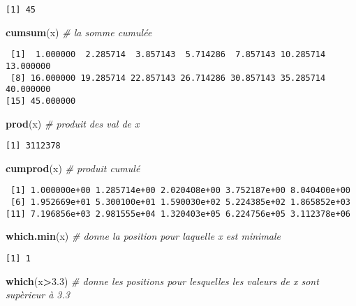 \documentclass[
]{article}
\newenvironment{Shaded}{\begin{snugshade}}{\end{snugshade}}
\newcommand{\CommentTok}[1]{\textcolor[rgb]{0.56,0.35,0.01}{\textit{#1}}}
\newcommand{\FloatTok}[1]{\textcolor[rgb]{0.00,0.00,0.81}{#1}}
\newcommand{\KeywordTok}[1]{\textcolor[rgb]{0.13,0.29,0.53}{\textbf{#1}}}
\newcommand{\NormalTok}[1]{#1}
\newcommand{\OperatorTok}[1]{\textcolor[rgb]{0.81,0.36,0.00}{\textbf{#1}}}
\begin{document}
\begin{verbatim}
[1] 45
\end{verbatim}

\begin{Shaded}
\begin{Highlighting}[]
\KeywordTok{cumsum}\NormalTok{(x) }\CommentTok{# la somme cumulée}
\end{Highlighting}
\end{Shaded}

\begin{verbatim}
 [1]  1.000000  2.285714  3.857143  5.714286  7.857143 10.285714 13.000000
 [8] 16.000000 19.285714 22.857143 26.714286 30.857143 35.285714 40.000000
[15] 45.000000
\end{verbatim}

\begin{Shaded}
\begin{Highlighting}[]
\KeywordTok{prod}\NormalTok{(x) }\CommentTok{# produit des val de x}
\end{Highlighting}
\end{Shaded}

\begin{verbatim}
[1] 3112378
\end{verbatim}

\begin{Shaded}
\begin{Highlighting}[]
\KeywordTok{cumprod}\NormalTok{(x) }\CommentTok{# produit cumulé}
\end{Highlighting}
\end{Shaded}

\begin{verbatim}
 [1] 1.000000e+00 1.285714e+00 2.020408e+00 3.752187e+00 8.040400e+00
 [6] 1.952669e+01 5.300100e+01 1.590030e+02 5.224385e+02 1.865852e+03
[11] 7.196856e+03 2.981555e+04 1.320403e+05 6.224756e+05 3.112378e+06
\end{verbatim}

\begin{Shaded}
\begin{Highlighting}[]
\KeywordTok{which.min}\NormalTok{(x)     }\CommentTok{# donne la position pour laquelle x est minimale}
\end{Highlighting}
\end{Shaded}

\begin{verbatim}
[1] 1
\end{verbatim}

\begin{Shaded}
\begin{Highlighting}[]
\KeywordTok{which}\NormalTok{(x}\OperatorTok{>}\FloatTok{3.3}\NormalTok{)  }\CommentTok{# donne les positions pour lesquelles les valeurs de x sont supèrieur à 3.3}
\end{Highlighting}
\end{Shaded}
\end{document}
